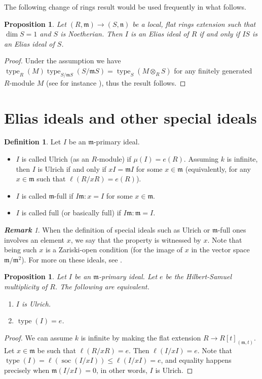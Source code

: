 \documentclass[a4paper,12pt]{amsart}
\newtheorem{prop}[thm]{\bf Proposition}
\theoremstyle{definition}
\newtheorem{definition}[thm]{\bf Definition}
\theoremstyle{remark}
\newtheorem{remark}[thm]{\bf Remark}
\numberwithin{equation}{section}
\DeclareMathOperator{\type}{{type}}
\DeclareMathOperator{\soc}{{{soc}}}
\def\fn{\mathfrak{n}}
\def\fm{\mathfrak{m}}
\begin{document}
The following change of rings result would be used frequently in what follows. 

\begin{prop}\label{changerings}
Let $(R,\fm)\to (S,\fn)$ be a local,  flat rings extension such that $\dim S=1$ and $S$ is Noetherian. Then $I$ is an Elias ideal of $R$ if and only if $IS$ is an Elias ideal of $S$. 


\end{prop}

\begin{proof}
Under the assumption we have $\type_R(M)\type_{S/\fm S}(S/\fm S)= \type_S(M\otimes_R S)$ for any finitely generated $R$-module $M$ (see for instance \cite{FT}), thus the result follows. 
\end{proof}


\section{Elias ideals and other special ideals}\label{sec2} 


\begin{definition}
Let $I$ be an $\fm$-primary ideal. 
\begin{itemize}
\item $I$ is called Ulrich (as an $R$-module) if  $\mu(I)=e(R)$. Assuming $k$ is infinite, then $I$ is Ulrich if and only if $xI=\fm I$ for some $x\in \fm$ (equivalently, for any $x\in \fm$ such that $\ell(R/xR)=e(R)$).  
\item $I$ is called $\fm$-full if $I\fm:x=I$ for some $x\in \fm$. 
\item $I$ is called full (or basically full) if $I\fm:\fm=I$. 
\end{itemize}
\end{definition}

\begin{remark}
When the definition of special ideals such as Ulrich or $\fm$-full ones involves an element $x$, we say that the property is witnessed by $x$. Note that being such $x$ is a Zariski-open condition (for the image of $x$ in the vector space $\fm/\fm^2$). For more on these ideals, see \cite{dms, HS, HRR, W}. 
\end{remark}

\begin{prop}\label{propUlrich}
Let $I$ be an $\fm$-primary ideal. Let $e$ be the Hilbert-Samuel multiplicity of $R$. The following are equivalent.
\begin{enumerate}
\item  $I$ is Ulrich.
\item  $\type(I)=e$. 
\end{enumerate}

\end{prop}
\begin{proof}
We can assume $k$ is infinite by making the flat extension $R\to R[t]_{(\fm,t)}$. Let $x\in \fm$ be such that $\ell(R/xR)=e$. Then $\ell(I/xI)=e$. Note that $\type(I)= \ell(\soc(I/xI)) \leq \ell(I/xI)=e$, and equality happens precisely when $\fm(I/xI)=0$, in other words, $I$ is Ulrich. 
\end{proof}
\end{document}
